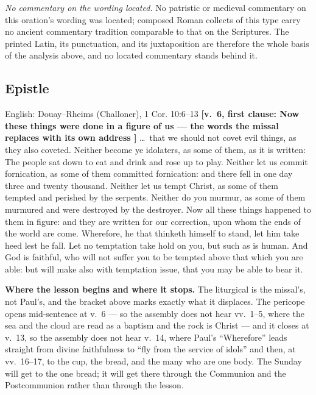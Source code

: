 \textit{No commentary on the wording located.} No patristic or medieval
commentary on this oration's wording was located; composed Roman collects of
this type carry no ancient commentary tradition comparable to that on the
Scriptures. The printed Latin, its punctuation, and its juxtaposition are
therefore the whole basis of the analysis above, and no located commentary
stands behind it.

\subsection*{Epistle }


\begin{namedtranslation}{English: Douay--Rheims (Challoner), 1 Cor. 10:6--13}
\textbf{[v.~6, first clause: Now these things were done in a figure of us ---
the words the missal replaces with its own address ]} \dots\
that we should not covet evil things, as they also coveted. Neither become ye
idolaters, as some of them, as it is written: The people sat down to eat and
drink and rose up to play. Neither let us commit fornication, as some of them
committed fornication: and there fell in one day three and twenty thousand.
Neither let us tempt Christ, as some of them tempted and perished by the
serpents. Neither do you murmur, as some of them murmured and were destroyed
by the destroyer. Now all these things happened to them in figure: and they
are written for our correction, upon whom the ends of the world are come.
Wherefore, he that thinketh himself to stand, let him take heed lest he fall.
Let no temptation take hold on you, but such as is human. And God is faithful,
who will not suffer you to be tempted above that which you are able: but will
make also with temptation issue, that you may be able to bear it.
\end{namedtranslation}

\textbf{Where the lesson begins and where it stops.} The liturgical
\latin{Fratres:} is the missal's, not Paul's, and the bracket above marks
exactly what it displaces. The pericope opens mid-sentence at v.~6 --- so the
assembly does not hear vv.~1--5, where the sea and the cloud are read as a
baptism and the rock is Christ --- and it closes at v.~13, so the assembly
does not hear v.~14, where Paul's ``Wherefore'' leads straight from divine
faithfulness to ``fly from the service of idols'' and then, at vv.~16--17, to
the cup, the bread, and the many who are one body. The Sunday will get to the
one bread; it will get there through the Communion and the Postcommunion
rather than through the lesson.

